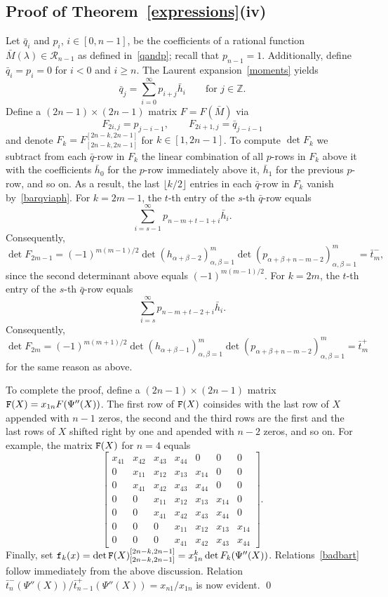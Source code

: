 \documentclass{amsart}
\theoremstyle{definition}
\theoremstyle{remark}
\numberwithin{equation}{section}
\numberwithin{theorem}{section}
\def\NF{{\tt F}}
\def\RR{{\mathcal R}}
\def\Z{{\mathbb Z}}
\def\ef{{\tt f}}
\begin{document}
\subsection{Proof of Theorem~\ref{expressions}(iv)} Let $\bar q_i$ and $p_i$, $i\in[0,n-1]$, be the coefficients of
a rational function $\bar M(\lambda)\in\RR_{n-1}$ as defined in~\eqref{qandp}; recall that $p_{n-1}=1$. Additionally, define $\bar q_i=p_i=0$ for $i<0$ and $i\ge n$. The Laurent expansion~\eqref{moments} yields
\begin{equation}\label{barqviaph}
\bar q_j=\sum_{i=0}^\infty p_{i+j}\bar h_i\qquad\text{for $j\in\Z$}.
\end{equation}
Define a $(2n-1)\times(2n-1)$ matrix $F=F(\bar M)$ via 
\[
F_{2i,j}=p_{j-i-1},\qquad F_{2i+1,j}=\bar q_{j-i-1}
\]
and denote $F_k= F_{[2n-k,2n-1]}^{[2n-k,2n-1]}$ for $k\in[1,2n-1]$. To compute $\det F_k$ we subtract from each $\bar q$-row in $F_k$ the linear combination of all $p$-rows in $F_k$ above it with the coefficients $\bar h_0$ for the $p$-row immediately above it, $\bar h_1$ for the previous $p$-row, and so on. As a result, the last $\lfloor k/2\rfloor$ entries in each $\bar q$-row in $F_k$ vanish by~\eqref{barqviaph}. For $k=2m-1$, 
the $t$-th entry of the $s$-th $\bar q$-row equals  
\[
\sum_{i=s-1}^\infty p_{n-m+t-1+i}\bar h_i.
\]
Consequently, 
\[
\det F_{2m-1}=(-1)^{m(m-1)/2}\det (h_{\alpha+\beta-2})_{\alpha,\beta=1}^{m} 
\det(p_{\alpha+\beta+n-m-2})_{\alpha,\beta=1}^{m}= \bar t_{m}^-,
\]
since the second determinant above equals $(-1)^{m(m-1)/2}$. 
For $k=2m$, 
the $t$-th entry of the $s$-th $\bar q$-row equals  
\[
\sum_{i=s}^\infty p_{n-m+t-2+i}\bar h_i.
\]
Consequently, 
\[
\det F_{2m}=(-1)^{m(m+1)/2}\det (h_{\alpha+\beta-1})_{\alpha,\beta=1}^{m} 
\det(p_{\alpha+\beta+n-m-2})_{\alpha,\beta=1}^{m}= \bar t_{m}^+
\]
for the same reason as above.

To complete the proof, define a $(2n-1)\times(2n-1)$ matrix $\NF(X)=x_{1n}F(\Psi''(X))$. The first row of $\NF(X)$ coinsides with the last row of $X$ appended with $n-1$ zeros, the second and the third rows are the first and the last rows of $X$ shifted right by one and apended with $n-2$ zeros, and so on. For example, the matrix $\NF(X)$ for $n=4$ equals
\[
\begin{bmatrix}
x_{41} & x_{42} & x_{43} & x_{44} & 0 & 0 & 0\\
0 & x_{11} & x_{12} & x_{13} & x_{14} & 0 & 0\\
0 & x_{41} & x_{42} & x_{43} & x_{44} & 0 & 0\\
0 & 0 & x_{11} & x_{12} & x_{13} & x_{14}  & 0 \\
0 & 0 & x_{41} & x_{42} & x_{43} & x_{44} & 0 \\
0 & 0 & 0 & x_{11} & x_{12} & x_{13} & x_{14}   \\
0 & 0 & 0 & x_{41} & x_{42} & x_{43} & x_{44} 
\end{bmatrix}.
\]
Finally, set $\ef_k(x)=
\det\NF(X)_{[2n-k,2n-1]}^{[2n-k,2n-1]}=x_{1n}^k\det F_k(\Psi''(X))$. Relations~\eqref{badbart} follow immediately from the above discussion. Relation $\bar t_n^-(\Psi''(X))/\bar t_{n-1}^+(\Psi''(X))=x_{n1}/x_{1n}$ is now evident. \qed
\end{document}
